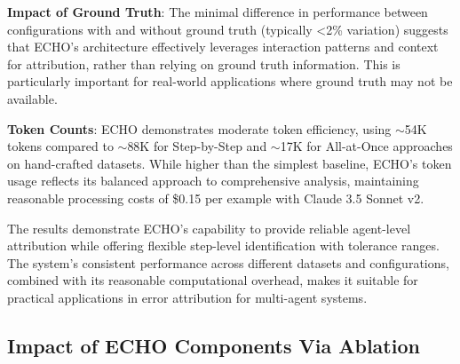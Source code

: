 \documentclass{article}
\begin{document}
\textbf{Impact of Ground Truth}:
The minimal difference in performance between configurations with and without ground truth (typically <2\% variation) suggests that ECHO's architecture effectively leverages interaction patterns and context for attribution, rather than relying on ground truth information. This is particularly important for real-world applications where ground truth may not be available.

\textbf{Token Counts}:
ECHO demonstrates moderate token efficiency, using $\sim$54K tokens compared to $\sim$88K for Step-by-Step and $\sim$17K for All-at-Once approaches on hand-crafted datasets. While higher than the simplest baseline, ECHO's token usage reflects its balanced approach to comprehensive analysis, maintaining reasonable processing costs of \$0.15 per example with Claude 3.5 Sonnet v2.

The results demonstrate ECHO's capability to provide reliable agent-level attribution while offering flexible step-level identification with tolerance ranges. The system's consistent performance across different datasets and configurations, combined with its reasonable computational overhead, makes it suitable for practical applications in error attribution for multi-agent systems.

\subsection{Impact of ECHO Components Via Ablation}
\end{document}
